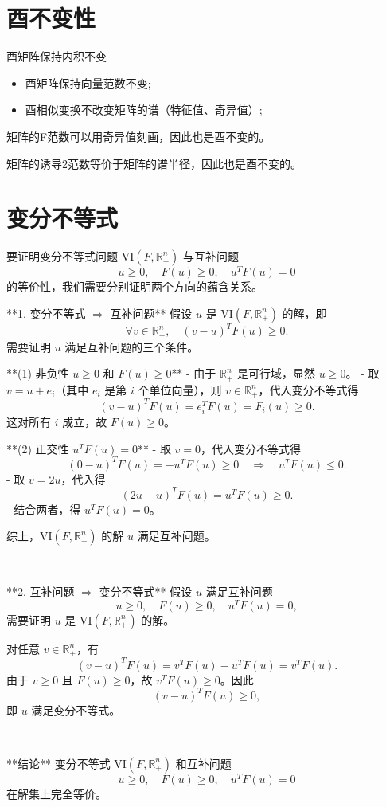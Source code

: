 \section{酉不变性}
\begin{myalert}
酉矩阵保持内积不变
\end{myalert}
\begin{shaded}
\begin{itemize}
\item 酉矩阵保持向量范数不变;
\item 酉相似变换不改变矩阵的谱（特征值、奇异值）;
\end{itemize}
\end{shaded}
矩阵的F范数可以用奇异值刻画，因此也是酉不变的。

矩阵的诱导2范数等价于矩阵的谱半径，因此也是酉不变的。
\section{变分不等式}
\begin{shaded}
要证明变分不等式问题 \(\text{VI}(F, \mathbb{R}^n_+)\) 与互补问题  
\[
u \geq 0, \quad F(u) \geq 0, \quad u^T F(u) = 0
\]  
的等价性，我们需要分别证明两个方向的蕴含关系。

**1. 变分不等式 \(\Rightarrow\) 互补问题**
假设 \(u\) 是 \(\text{VI}(F, \mathbb{R}^n_+)\) 的解，即  
\[
\forall v \in \mathbb{R}^n_+, \quad (v - u)^T F(u) \geq 0.
\]  
需要证明 \(u\) 满足互补问题的三个条件。

**(1) 非负性 \(u \geq 0\) 和 \(F(u) \geq 0\)**
- 由于 \(\mathbb{R}^n_+\) 是可行域，显然 \(u \geq 0\)。
- 取 \(v = u + e_i\)（其中 \(e_i\) 是第 \(i\) 个单位向量），则 \(v \in \mathbb{R}^n_+\)，代入变分不等式得  
\[
(v - u)^T F(u) = e_i^T F(u) = F_i(u) \geq 0.
\]  
这对所有 \(i\) 成立，故 \(F(u) \geq 0\)。

**(2) 正交性 \(u^T F(u) = 0\)**
- 取 \(v = 0\)，代入变分不等式得  
\[
(0 - u)^T F(u) = -u^T F(u) \geq 0 \quad \Rightarrow \quad u^T F(u) \leq 0.
\]  
- 取 \(v = 2u\)，代入得  
\[
(2u - u)^T F(u) = u^T F(u) \geq 0.
\]  
- 结合两者，得 \(u^T F(u) = 0\)。

综上，\(\text{VI}(F, \mathbb{R}^n_+)\) 的解 \(u\) 满足互补问题。

---

**2. 互补问题 \(\Rightarrow\) 变分不等式**
假设 \(u\) 满足互补问题  
\[
u \geq 0, \quad F(u) \geq 0, \quad u^T F(u) = 0,
\]  
需要证明 \(u\) 是 \(\text{VI}(F, \mathbb{R}^n_+)\) 的解。

对任意 \(v \in \mathbb{R}^n_+\)，有  
\[
(v - u)^T F(u) = v^T F(u) - u^T F(u) = v^T F(u).
\]  
由于 \(v \geq 0\) 且 \(F(u) \geq 0\)，故 \(v^T F(u) \geq 0\)。因此  
\[
(v - u)^T F(u) \geq 0,
\]  
即 \(u\) 满足变分不等式。

---

**结论**
变分不等式 \(\text{VI}(F, \mathbb{R}^n_+)\) 和互补问题  
\[
u \geq 0, \quad F(u) \geq 0, \quad u^T F(u) = 0
\]  
在解集上完全等价。
\end{shaded}
\newpage
